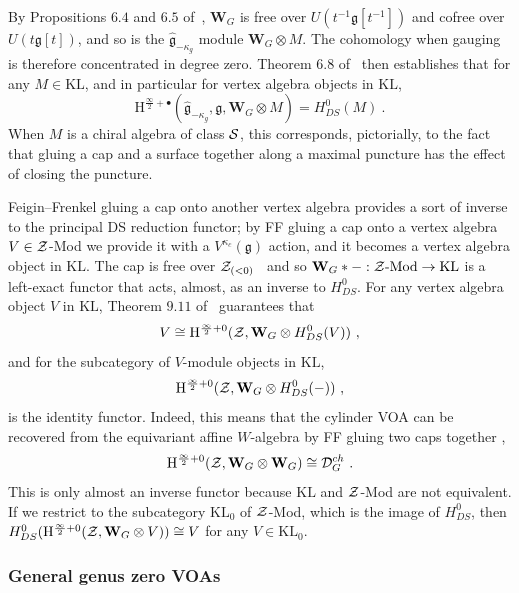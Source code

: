 \documentclass[a4paper]{article}
\def\SS{{\cal S}}
\def\ZZ{{\cal Z}}
\def\gf{\mathfrak{g}}
\def \KL{\mathrm{KL}}
\newcommand{\Hi}[1]{\mathrm{H}^{\frac{\infty}{2}+#1}}
\def\D{\mathcal{D}^{ch}}
\def\W{\mathbf{W}}
\begin{document}
By Propositions $6.4$ and $6.5$ of~\cite{Arakawa:2018egx}, $\W_G$ is free over $U(t^{-1}\gf[t^{-1}])$ and cofree over $U(t\gf[t])$, and so is the $\hat{\gf}_{-\kappa_g}$ module $\W_G\otimes M$. The cohomology when gauging is therefore concentrated in degree zero. Theorem $6.8$ of~\cite{Arakawa:2018egx} then establishes that for any $M\in\KL$, and in particular for vertex algebra objects in $\KL$,
\begin{equation}
    \Hi{\bullet}(\hat{\gf}_{-\kappa_g},\gf,\W_G\otimes M) = H^0_{DS}(M)~.
\end{equation}
When $M$ is a chiral algebra of class $\SS$, this corresponds, pictorially, to the fact that gluing a cap and a surface together along a maximal puncture has the effect of closing the puncture. 

Feigin--Frenkel gluing a cap onto another vertex algebra provides a sort of inverse to the principal DS reduction functor; by FF gluing a cap onto a vertex algebra $V\in\ZZ$-Mod we provide it with a $V^{\kappa_c}(\gf)$ action, and it becomes a vertex algebra object in $\KL$. The cap is free over $\ZZ_{(<0)}$~\cite{Arakawa:2018egx} and so $\W_G\ast-:\ZZ\text{-Mod}\rightarrow\KL$ is a left-exact functor that acts, almost, as an inverse to $H^0_{DS}$. For any vertex algebra object $V$ in $\KL$, Theorem $9.11$ of~\cite{Arakawa:2018egx} guarantees that
\begin{equation}
\label{eq:dsid}
	V\cong \Hi{0}(\ZZ,\W_G\otimes H^{0}_{DS}(V))~,
\end{equation}
and for the subcategory of $V$-module objects in $\KL$,
\begin{equation}
	\Hi{0}(\ZZ,\W_G\otimes H^0_{DS}(-))~,
\end{equation}
is the identity functor. Indeed, this means that the cylinder VOA can be recovered from the equivariant affine $W$-algebra by FF gluing two caps together \cite{Arakawa:2018egx},
\begin{equation}
	\Hi{0}(\ZZ,\W_G\otimes\W_G)\cong \D_G~.
\end{equation}
This is only almost an inverse functor because $\KL$ and $\ZZ$-Mod are not equivalent. If we restrict to the subcategory $\KL_0$ of $\ZZ$-Mod, which is the image of $H^0_{DS}$, then $H^0_{DS}(\Hi{0}(\ZZ,\W_G\otimes V))\cong V$ for any $V\in\KL_0$.

\subsubsection*{General genus zero VOAs}
\end{document}
